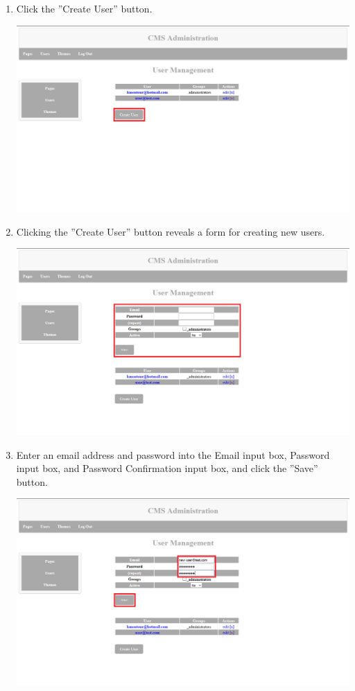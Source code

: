 \documentclass[12pt]{article}
\begin{document}
\begin{enumerate}
  \item Click the ''Create User'' button.
  
  \includegraphics[width=\textwidth,height=\textheight,keepaspectratio]{pics/createBasicUser_4.png}
  
  \pagebreak
  
  \item Clicking the ''Create User'' button reveals a form for creating new users.
  
  \includegraphics[width=\textwidth,height=\textheight,keepaspectratio]{pics/createBasicUser_5.png}
  
  \item Enter an email address and password into the Email input box, Password input box, and Password Confirmation input box, and click the ''Save'' button.
  
  \includegraphics[width=\textwidth,height=\textheight,keepaspectratio]{pics/createBasicUser_6.png}
  

\end{enumerate}
\end{document}
